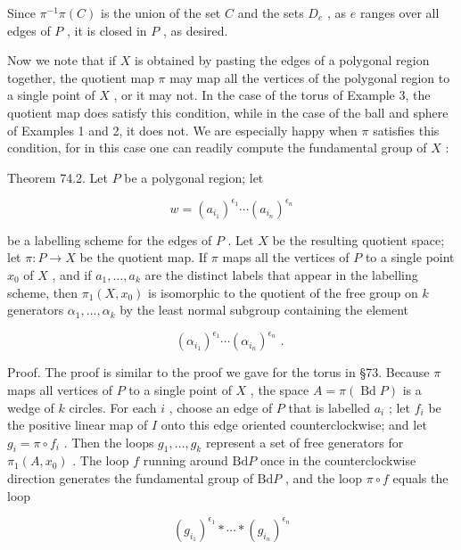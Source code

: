 Since \({\pi }^{-1}\pi \left( C\right)\) is the union of the set \(C\) and the sets \({D}_{e}\) , as \(e\) ranges over all edges of \(P\) , it is closed in \(P\) , as desired.

Now we note that if \(X\) is obtained by pasting the edges of a polygonal region together, the quotient map \(\pi\) may map all the vertices of the polygonal region to a single point of \(X\) , or it may not. In the case of the torus of Example 3, the quotient map does satisfy this condition, while in the case of the ball and sphere of Examples 1 and 2, it does not. We are especially happy when \(\pi\) satisfies this condition, for in this case one can readily compute the fundamental group of \(X\) :

Theorem 74.2. Let \(P\) be a polygonal region; let

\[
w = {\left( {a}_{{i}_{1}}\right) }^{{\epsilon }_{1}}\cdots {\left( {a}_{{i}_{n}}\right) }^{{\epsilon }_{n}}
\]

be a labelling scheme for the edges of \(P\) . Let \(X\) be the resulting quotient space; let \(\pi  : P \rightarrow  X\) be the quotient map. If \(\pi\) maps all the vertices of \(P\) to a single point \({x}_{0}\) of \(X\) , and if \({a}_{1},\ldots ,{a}_{k}\) are the distinct labels that appear in the labelling scheme, then \({\pi }_{1}\left( {X,{x}_{0}}\right)\) is isomorphic to the quotient of the free group on \(k\) generators \({\alpha }_{1},\ldots ,{\alpha }_{k}\) by the least normal subgroup containing the element

\[
{\left( {\alpha }_{{i}_{1}}\right) }^{{\epsilon }_{1}}\cdots {\left( {\alpha }_{{i}_{n}}\right) }^{{\epsilon }_{n}}\text{ . }
\]

Proof. The proof is similar to the proof we gave for the torus in  \S 73. Because \(\pi\) maps all vertices of \(P\) to a single point of \(X\) , the space \(A = \pi \left( {\operatorname{Bd}P}\right)\) is a wedge of \(k\) circles. For each \(i\) , choose an edge of \(P\) that is labelled \({a}_{i}\) ; let \({f}_{i}\) be the positive linear map of \(I\) onto this edge oriented counterclockwise; and let \({g}_{i} = \pi  \circ  {f}_{i}\) . Then the loops \({g}_{1},\ldots ,{g}_{k}\) represent a set of free generators for \({\pi }_{1}\left( {A,{x}_{0}}\right)\) . The loop \(f\) running around \(\mathrm{{Bd}}P\) once in the counterclockwise direction generates the fundamental group of \(\mathrm{{Bd}}P\) , and the loop \(\pi  \circ  f\) equals the loop

\[
{\left( {g}_{{i}_{1}}\right) }^{{\epsilon }_{1}} * \cdots  * {\left( {g}_{{i}_{n}}\right) }^{{\epsilon }_{n}}
\]

